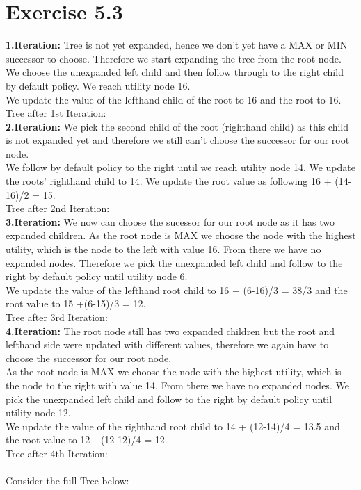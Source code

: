 \documentclass[12pt]{article}
\begin{document}
\section*{Exercise 5.3}
\textbf{1.Iteration:} Tree is not yet expanded, hence we don't yet have a MAX or MIN successor to choose. Therefore we start expanding the tree from the root node. \\
We choose the unexpanded left child and then follow through to the right child by default policy. We reach utility node 16.\\
We update the value of the lefthand child of the root to 16 and the root to 16.\\
Tree after 1st Iteration:\\
\textbf{2.Iteration:} We pick the second child of the root (righthand child) as this child is not expanded yet and therefore we still can't choose the successor for our root node. \\ 
We follow by default policy to the right until we reach utility node 14. We update the roots' righthand child to 14. We update the root value as following 16 + (14-16)/2 = 15.\\
Tree after 2nd Iteration:\\
\textbf{3.Iteration:} We now can choose the sucessor for our root node as it has two expanded children. As the root node is MAX we choose the node with the highest utility, which is the node to the left with value 16. From there we have no expanded nodes. Therefore we pick the unexpanded left child and follow to the right by default policy until utility node 6.\\
We update the value of the lefthand root child to 16 + (6-16)/3 = 38/3 and the root value to 15 +(6-15)/3 = 12.\\
Tree after 3rd Iteration:\\
\textbf{4.Iteration:} The root node still has two expanded children but the root and lefthand side were updated with different values, therefore we again have to choose the successor for our root node.\\
As the root node is MAX we choose the node with the highest utility, which is the node to the right with value 14. From there we have no expanded nodes. We pick the unexpanded left child and follow to the right by default policy until utility node 12.\\
We update the value of the righthand root child to 14 + (12-14)/4 = 13.5 and the root value to 12 +(12-12)/4 = 12.\\
Tree after 4th Iteration:\\ \\
Consider the full Tree below: \\
\end{document}
